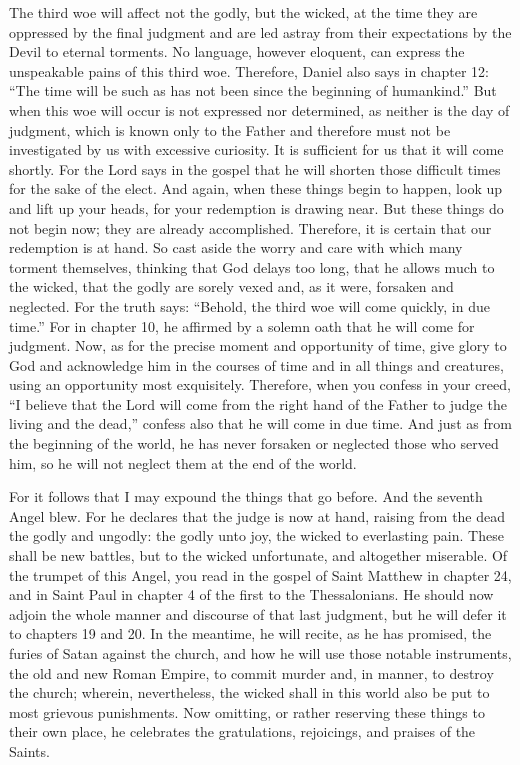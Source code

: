 The third woe will affect not the godly, but the wicked, at the time they are oppressed by the final judgment and are led astray from their expectations by the Devil to eternal torments. No language, however eloquent, can express the unspeakable pains of this third woe. Therefore, Daniel also says in chapter 12: “The time will be such as has not been since the beginning of humankind.” But when this woe will occur is not expressed nor determined, as neither is the day of judgment, which is known only to the Father and therefore must not be investigated by us with excessive curiosity. It is sufficient for us that it will come shortly. For the Lord says in the gospel that he will shorten those difficult times for the sake of the elect. And again, when these things begin to happen, look up and lift up your heads, for your redemption is drawing near. But these things do not begin now; they are already accomplished. Therefore, it is certain that our redemption is at hand. So cast aside the worry and care with which many torment themselves, thinking that God delays too long, that he allows much to the wicked, that the godly are sorely vexed and, as it were, forsaken and neglected. For the truth says: “Behold, the third woe will come quickly, in due time.” For in chapter 10, he affirmed by a solemn oath that he will come for judgment. Now, as for the precise moment and opportunity of time, give glory to God and acknowledge him in the courses of time and in all things and creatures, using an opportunity most exquisitely. Therefore, when you confess in your creed, “I believe that the Lord will come from the right hand of the Father to judge the living and the dead,” confess also that he will come in due time. And just as from the beginning of the world, he has never forsaken or neglected those who served him, so he will not neglect them at the end of the world.

For it follows that I may expound the things that go before. And the seventh Angel blew. For he declares that the judge is now at hand, raising from the dead the godly and ungodly: the godly unto joy, the wicked to everlasting pain. These shall be new battles, but to the wicked unfortunate, and altogether miserable. Of the trumpet of this Angel, you read in the gospel of Saint Matthew in chapter 24, and in Saint Paul in chapter 4 of the first to the Thessalonians. He should now adjoin the whole manner and discourse of that last judgment, but he will defer it to chapters 19 and 20. In the meantime, he will recite, as he has promised, the furies of Satan against the church, and how he will use those notable instruments, the old and new Roman Empire, to commit murder and, in manner, to destroy the church; wherein, nevertheless, the wicked shall in this world also be put to most grievous punishments. Now omitting, or rather reserving these things to their own place, he celebrates the gratulations, rejoicings, and praises of the Saints.

